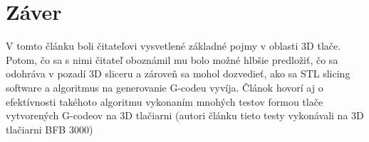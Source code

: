 \documentclass[10pt,twoside,slovak,a4paper]{article}
\begin{document}
\section{Záver}
    V tomto článku boli čitateľovi vysvetlené základné pojmy v oblasti 3D tlače. Potom, čo sa s nimi čitateľ oboznámil mu bolo možné hlbšie predložiť, čo sa odohráva v pozadí 3D sliceru a zároveň sa mohol dozvedieť, ako sa STL slicing software a algoritmus na generovanie G-codeu vyvíja. Článok hovorí aj o efektívnosti takéhoto algoritmu vykonaním mnohých testov formou tlače vytvorených G-codeov na 3D tlačiarni (autori článku \cite{6757836} tieto testy vykonávali na 3D tlačiarni BFB 3000) 

 
\end{document}
